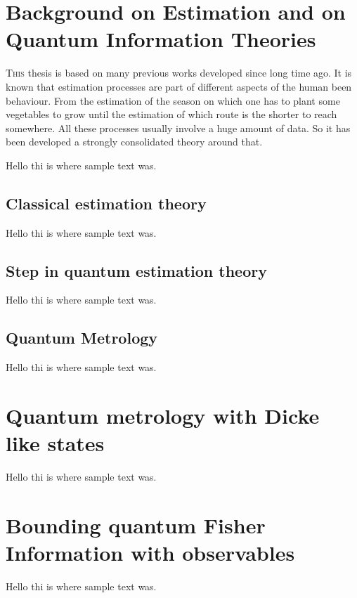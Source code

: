 \documentclass[12pt, letterpaper, twoside]{article}
\newcounter{observ}
\begin{document}



\section{Background on Estimation and on Quantum Information Theories}

\lettrine[lines=2, findent=3pt,nindent=0pt]{T}{his} thesis is based on
many previous works developed since long time ago.
It is known that estimation processes are part of different
aspects of the human been behaviour.
From the estimation of the season on which one has 
to plant some vegetables to grow until the estimation of which route is the
shorter to reach somewhere. 
All these processes usually involve a huge amount of data. 
So it has been developed a strongly consolidated theory around that.

Hello thi is where sample text was. 

\subsection{Classical estimation theory}
Hello thi is where sample text was.

\subsection{Step in quantum estimation theory}
Hello thi is where sample text was.

\subsection{Quantum Metrology}
Hello thi is where sample text was.

\section{Quantum metrology with Dicke like states}
Hello thi is where sample text was.

\section[Bounding qFI with observables]
{Bounding quantum Fisher \qquad\qquad\, Information with observables}
Hello thi is where sample text was.
\end{document}
